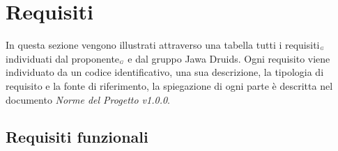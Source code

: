 \chapter{Requisiti}\label{Requisiti}
In questa sezione vengono illustrati attraverso una tabella tutti i requisiti$_{\scaleto{G}{3pt}}$ individuati dal proponente$_{\scaleto{G}{3pt}}$ e dal gruppo Jawa Druids. Ogni requisito viene individuato da un codice identificativo, una sua descrizione, la tipologia di requisito e la fonte di riferimento, la spiegazione di ogni parte è descritta nel documento \textit{Norme del Progetto v1.0.0}.
\section{Requisiti funzionali}\label{RequisitiFunzionali}

\def\tabularxcolumn#1{m{#1}}
